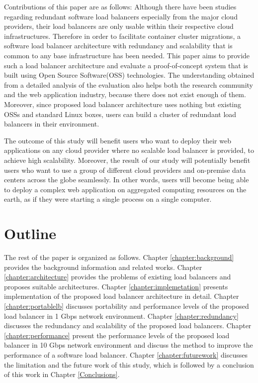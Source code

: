 Contributions of this paper are as follows:
Although there have been studies regarding redundant software load balancers especially from the major cloud providers\cite{eisenbud2016maglev,patel2013ananta}, their load balancers are only usable within their respective cloud infrastructures.
Therefore in order to facilitate container cluster migrations, a software load balancer architecture with redundancy and scalability that is common to any base infrastructure has been needed.
This paper aims to provide such a load balancer architecture and evaluate a proof-of-concept system that is built using Open Source Software(OSS) technologies.
The understanding obtained from a detailed analysis of the evaluation also helps both the research community and the web application industry, because there does not exist enough of them.
Moreover, since proposed load balancer architecture uses nothing but existing OSSs and standard Linux boxes, users can build a cluster of redundant load balancers in their environment.

The outcome of this study will benefit users who want to deploy their web applications on any cloud provider where no scalable load balancer is provided, to achieve high scalability.
Moreover, the result of our study will potentially benefit users who want to use a group of different cloud providers and on-premise data centers across the globe seamlessly.
In other words, users will become being able to deploy a complex web application on aggregated computing resources on the earth, as if they were starting a single process on a single computer.

\section{Outline}

The rest of the paper is organized as follows.
Chapter \ref{chapter:background} provides the background information and related works.
Chapter \ref{chapter:architecture} provides the problems of existing load balancers and proposes suitable architectures.
Chapter \ref{chapter:implemetation} presents implementation of the proposed load balancer architecture in detail.
Chapter \ref{chapter:portablelb} discusses portability and performance levels of the proposed load balancer in 1 Gbps network environment.
Chapter \ref{chapter:redundancy} discusses the redundancy and scalability of the proposed load balancers.
Chapter \ref{chapter:performance} present the performance levels of the proposed load balancer in 10 Gbps network environment and discuss the method to improve the performance of a software load balancer.
Chapter \ref{chapter:futurework} discusses the limitation and the future work of this study,
which is followed by a conclusion of this work in Chapter \ref{Conclusions}.





